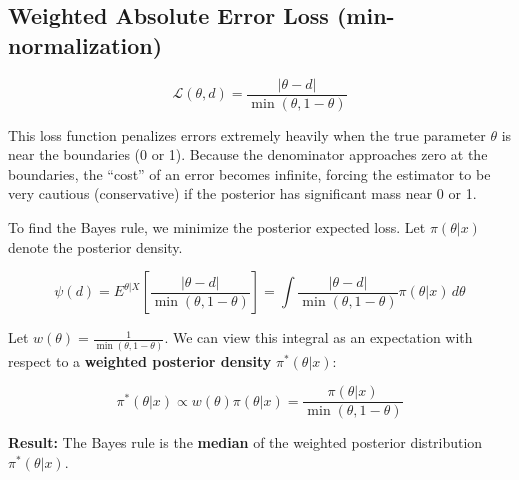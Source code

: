 \documentclass[
  letterpaper,
  DIV=11,
  numbers=noendperiod]{scrreprt}
\renewcommand{\[}{\begin{equation}}
\renewcommand{\]}{\end{equation}}
\theoremstyle{definition}
\theoremstyle{plain}
\theoremstyle{plain}
\theoremstyle{plain}
\theoremstyle{definition}
\theoremstyle{plain}
\theoremstyle{remark}
\begin{document}
\subsection{Weighted Absolute Error Loss
(min-normalization)}\label{weighted-absolute-error-loss-min-normalization}

\[\mathcal{L}(\theta, d) = \frac{|\theta - d|}{\min(\theta, 1-\theta)}\]

This loss function penalizes errors extremely heavily when the true
parameter \(\theta\) is near the boundaries (0 or 1). Because the
denominator approaches zero at the boundaries, the ``cost'' of an error
becomes infinite, forcing the estimator to be very cautious
(conservative) if the posterior has significant mass near 0 or 1.

To find the Bayes rule, we minimize the posterior expected loss. Let
\(\pi(\theta|x)\) denote the posterior density.

\[
\psi(d) = E^{\theta|X} \left[ \frac{|\theta - d|}{\min(\theta, 1-\theta)} \right] = \int \frac{|\theta - d|}{\min(\theta, 1-\theta)} \pi(\theta|x) \, d\theta
\]

Let \(w(\theta) = \frac{1}{\min(\theta, 1-\theta)}\). We can view this
integral as an expectation with respect to a \textbf{weighted posterior
density} \(\pi^*(\theta|x)\):

\[
\pi^*(\theta|x) \propto w(\theta) \pi(\theta|x) = \frac{\pi(\theta|x)}{\min(\theta, 1-\theta)}
\]

\textbf{Result:} The Bayes rule is the \textbf{median} of the weighted
posterior distribution \(\pi^*(\theta|x)\).
\end{document}
